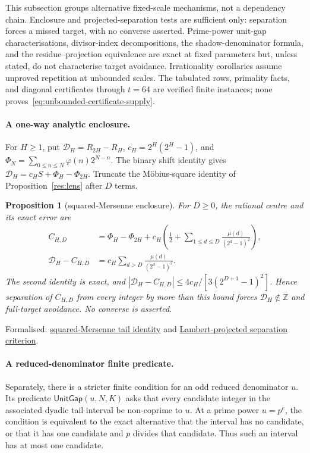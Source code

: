 \documentclass[11pt]{article}
\newcommand{\commit}{312b96c0d149ed466725c62d4ef24cfc91bca34e}
\newcommand{\repobase}{https://github.com/wcook04/plectis-lean-erdos249-257/blob/\commit}
\newcommand{\PK}{Erdos249257}
\newcommand{\lword}[4]{\href{\repobase/\PK/#1\#L#2}{#4}}
\newtheorem{proposition}[theorem]{Proposition}
\theoremstyle{definition}
\theoremstyle{remark}
\newcommand{\Z}{\mathbb{Z}}
\newcommand{\ph}{\varphi}
\begin{document}
{This subsection groups alternative fixed-scale mechanisms, not a dependency
chain.  Enclosure and projected-separation tests are sufficient only:
separation forces a missed target, with no converse asserted.  Prime-power
unit-gap characterisations, divisor-index decompositions, the shadow-denominator
formula, and the residue--projection equivalence are exact at fixed parameters
but, unless stated, do not characterise target avoidance.  Irrationality
corollaries assume unproved repetition at unbounded scales.  The tabulated
rows, primality facts, and diagonal certificates through $t=64$ are verified
finite instances; none proves~\eqref{eq:unbounded-certificate-supply}.

\paragraph{A one-way analytic enclosure.}
For $H\ge1$, put $\mathcal D_H=R_{2H}-R_H$,
$c_H=2^H(2^H-1)$, and
$\Phi_N=\sum_{0\le n\le N}\ph(n)2^{N-n}$.  The binary shift identity gives
$\mathcal D_H=c_HS+\Phi_H-\Phi_{2H}$.  Truncate the M\"obius-square identity
of Proposition~\ref{res:lens} after $D$ terms.

\begin{proposition}[squared-Mersenne enclosure]\label{res:squareenclosure}
For $D\ge0$, the rational centre and its exact error are
\[
 \begin{aligned}
 C_{H,D}&=\Phi_H-\Phi_{2H}
   +c_H\left(\frac12+\sum_{1\le d\le D}
      \frac{\mu(d)}{(2^d-1)^2}\right),\\
 \mathcal D_H-C_{H,D}
   &=c_H\sum_{d>D}\frac{\mu(d)}{(2^d-1)^2}.
 \end{aligned}
\]
The second identity is exact, and
$|\mathcal D_H-C_{H,D}|\le4c_H/[3(2^{D+1}-1)^2]$.  Hence separation of
$C_{H,D}$ from every integer by more than this bound forces
$\mathcal D_H\notin\Z$ and full-target avoidance.  No converse is asserted.
\end{proposition}
\noindent Formalised:
\lword{SquaredMersenneDiagonalEnclosure.lean}{138}{scaleDiagonalTailDifference_sub_lambertProjectedDiagonal}{squared-Mersenne tail identity}
and
\lword{SquaredMersenneDiagonalEnclosure.lean}{426}{scaleFullTarget_miss_of_lambert_projected_separation}{Lambert-projected separation criterion}.

\paragraph{A reduced-denominator finite predicate.}  Separately, there is a
stricter finite condition for an odd reduced denominator
$u$.  Its predicate $\mathsf{UnitGap}(u,N,K)$ asks that
every candidate integer in the associated dyadic tail interval be non-coprime
to $u$.  At a prime power $u=p^e$, the condition is equivalent to the exact
alternative that the interval has no candidate, or that it has one candidate
and $p$ divides that candidate.  Thus such an interval has at most one
candidate.

}
\end{document}
